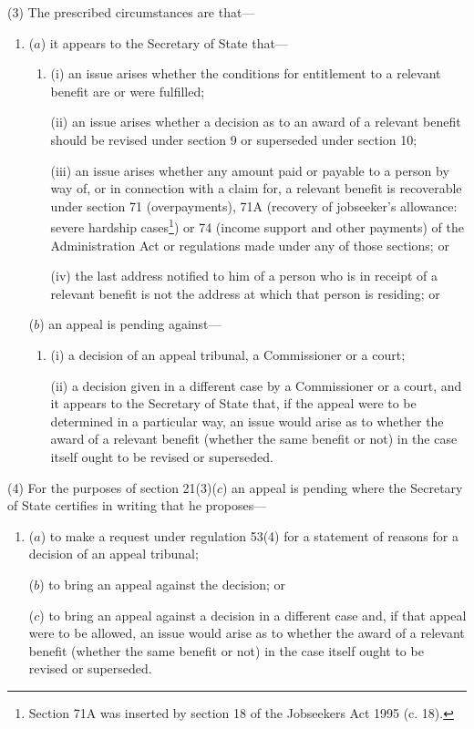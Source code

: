 \documentclass[12pt,a4paper]{article}
\begin{document}
(3) The prescribed circumstances are that—
\begin{enumerate}\item[]
($a$) it appears to the Secretary of State that—
\begin{enumerate}\item[]
(i) an issue arises whether the conditions for entitlement to a relevant benefit are or were fulfilled;

(ii) an issue arises whether a decision as to an award of a relevant benefit should be revised under section 9 or superseded under section 10;

(iii) an issue arises whether any amount paid or payable to a person by way of, or in connection with a claim for, a relevant benefit is recoverable under section 71 (overpayments), 71A (recovery of jobseeker’s allowance: severe hardship cases\footnote{\frenchspacing Section 71A was inserted by section 18 of the Jobseekers Act 1995 (c. 18).}) or 74 (income support and other payments) of the Administration Act or regulations made under any of those sections; or

(iv) the last address notified to him of a person who is in receipt of a relevant benefit is not the address at which that person is residing; or
\end{enumerate}

($b$) an appeal is pending against—
\begin{enumerate}\item[]
(i) a decision of an appeal tribunal, a Commissioner or a court;

(ii) a decision given in a different case by a Commissioner or a court, and it appears to the Secretary of State that, if the appeal were to be determined in a particular way, an issue would arise as to whether the award of a relevant benefit (whether the same benefit or not) in the case itself ought to be revised or superseded.
\end{enumerate}
\end{enumerate}

(4) For the purposes of section 21(3)($c$) an appeal is pending where the Secretary of State certifies in writing that he proposes—
\begin{enumerate}\item[]
($a$) to make a request under regulation 53(4) for a statement of reasons for a decision of an appeal tribunal;

($b$) to bring an appeal against the decision; or

($c$) to bring an appeal against a decision in a different case and, if that appeal were to be allowed, an issue would arise as to whether the award of a relevant benefit (whether the same benefit or not) in the case itself ought to be revised or superseded.
\end{enumerate}
\end{document}
